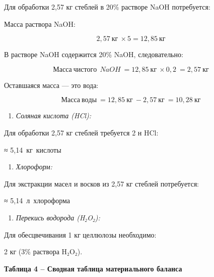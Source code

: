 Для обработки 2,57 кг стеблей в 20\% растворе NaOH потребуется:

Масса раствора NaOH:

\[2,57\ кг\  \times 5 = 12,85\ кг\]

В растворе NaOH содержится 20\% NaOH, следовательно:

\[Масса\ чистого\ \ NaOH\  = 12,85\ кг\  \times 0,2\  = 2,57\ кг\]

Оставшаяся масса --- это вода:

\[Масса\ воды\  = 12,85\ кг\  - 2,57\ кг\  = 10,28\ кг\]

\begin{enumerate}
\def\labelenumi{\arabic{enumi}.}
\setcounter{enumi}{2}
\item
  \emph{Соляная кислота (HCl):}
\end{enumerate}

Для обработки 2,57 кг стеблей требуется 2 н HCl:

≈ 5,14~кг~кислоты

\begin{enumerate}
\def\labelenumi{\arabic{enumi}.}
\setcounter{enumi}{3}
\item
  \emph{Хлороформ:}
\end{enumerate}

Для экстракции масел и восков из 2,57 кг стеблей потребуется:

≈ 5,14~л~хлороформа

\begin{enumerate}
\def\labelenumi{\arabic{enumi}.}
\setcounter{enumi}{4}
\item
  \emph{Перекись водорода (H₂O₂):}
\end{enumerate}

Для обесцвечивания 1 кг целлюлозы необходимо:

2 кг (3\% раствора H₂O₂).

{\bfseries Таблица 4 -- Сводная таблица материального баланса}

